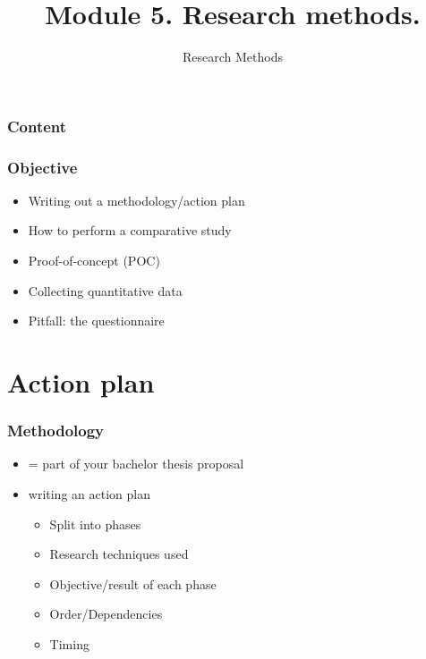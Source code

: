 \documentclass[aspectratio=169]{beamer}
\title{Module 5. Research methods.}
\subtitle{Research Methods}
\author{\lecturers}   %
\date{\academicyear}
\begin{document}
\begin{frame}
  \maketitle
\end{frame}

\begin{frame}
  \frametitle{Content}

  \tableofcontents
\end{frame}

\begin{frame}
  \frametitle{Objective}

  \begin{itemize}
    \item Writing out a methodology/action plan
    \item How to perform a comparative study
    \item Proof-of-concept (POC)
    \item Collecting quantitative data
    \item Pitfall: the questionnaire  
  \end{itemize}
\end{frame}

\section{Action plan}

\begin{frame}
  \frametitle{Methodology}

  \begin{itemize}
      \item = part of your bachelor thesis proposal
      \item writing an action plan
      \begin{itemize}
          \item Split into phases
          \item Research techniques used
          \item Objective/result of each phase
          \item Order/Dependencies
          \item Timing   
    \end{itemize}
  \end{itemize}


\end{frame}
\end{document}
